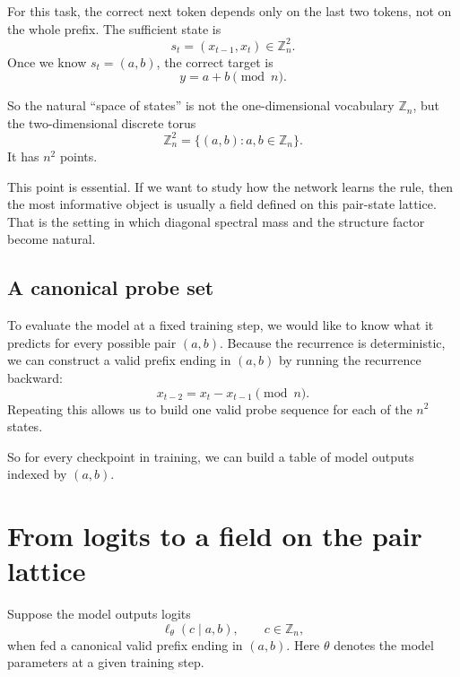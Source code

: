 \documentclass[11pt]{article}
\newcommand{\Zn}{\mathbb{Z}_n}
\begin{document}
For this task, the correct next token depends only on the last two tokens, not on the whole prefix. The sufficient state is
\begin{equation}
    s_t = (x_{t-1},x_t) \in \Zn^2.
\end{equation}
Once we know $s_t=(a,b)$, the correct target is
\begin{equation}
    y = a+b \pmod n.
\end{equation}

So the natural ``space of states'' is not the one-dimensional vocabulary $\Zn$, but the two-dimensional discrete torus
\begin{equation}
    \Zn^2 = \{(a,b): a,b \in \Zn\}.
\end{equation}
It has $n^2$ points.

This point is essential. If we want to study how the network learns the rule, then the most informative object is usually a field defined on this pair-state lattice. That is the setting in which diagonal spectral mass and the structure factor become natural.

\subsection{A canonical probe set}

To evaluate the model at a fixed training step, we would like to know what it predicts for every possible pair $(a,b)$. Because the recurrence is deterministic, we can construct a valid prefix ending in $(a,b)$ by running the recurrence backward:
\begin{equation}
    x_{t-2} = x_t - x_{t-1} \pmod n.
\end{equation}
Repeating this allows us to build one valid probe sequence for each of the $n^2$ states.

So for every checkpoint in training, we can build a table of model outputs indexed by $(a,b)$.

\section{From logits to a field on the pair lattice}

Suppose the model outputs logits
\begin{equation}
    \ell_\theta(c \mid a,b), \qquad c \in \Zn,
\end{equation}
when fed a canonical valid prefix ending in $(a,b)$. Here $\theta$ denotes the model parameters at a given training step.
\end{document}
